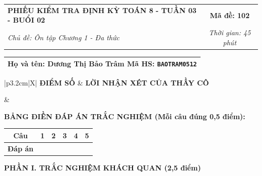 \documentclass[12pt,a4paper]{article}
\begin{document}
\newpage


\noindent
\begin{tabularx}{\linewidth}{|X|c|}
\hline
\textbf{PHIẾU KIỂM TRA ĐỊNH KỲ TOÁN 8 - TUẦN 03 - BUỔI 02} & \textbf{Mã đề: 102} \\
\textit{Chủ đề: Ôn tập Chương 1 - Đa thức} & \textit{Thời gian: 45 phút} \\
\hline
\end{tabularx}

\vspace{1mm}

\noindent
\begin{tabularx}{\linewidth}{|X|}
\hline
\rule[-2mm]{0pt}{7.5mm}\textbf{Họ và tên:} \textbf{\large Dương Thị Bảo Trâm} \hfill \textbf{Mã HS:} \texttt{BAOTRAM0512} \quad \\
\hline
\end{tabularx}

\vspace{1mm}

\noindent
\begin{tabularx}{\linewidth}{|p{3.2cm}|X|}
\hline
\centering\textbf{ĐIỂM SỐ} & \centering\textbf{LỜI NHẬN XÉT CỦA THẦY CÔ} \tabularnewline
\hline
\rule{0pt}{1.3cm} & \tabularnewline
\hline
\end{tabularx}

\vspace{1.2mm}

\noindent\textbf{BẢNG ĐIỀN ĐÁP ÁN TRẮC NGHIỆM (Mỗi câu đúng 0,5 điểm):}
\vspace{0.8mm}

\noindent
\renewcommand{\arraystretch}{1.35}
\begin{tabularx}{\linewidth}{|c|*{5}{>{\centering\arraybackslash}X|}}
\hline
\textbf{Câu} & \textbf{1} & \textbf{2} & \textbf{3} & \textbf{4} & \textbf{5} \\
\hline
\textbf{Đáp án} & & & & & \\
\hline
\end{tabularx}
\renewcommand{\arraystretch}{1.0}

\vspace{1.5mm}

\noindent\textbf{\large PHẦN I. TRẮC NGHIỆM KHÁCH QUAN (2,5 điểm)}
\vspace{1mm}
\end{document}

